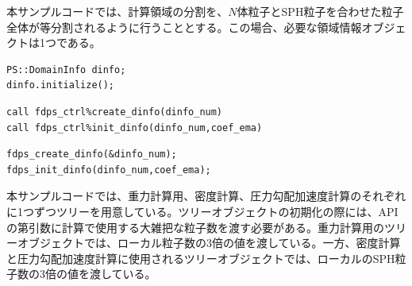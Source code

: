 本サンプルコードでは、計算領域の分割を、$N$体粒子とSPH粒子を合わせた粒子全体が等分割されるように行うこととする。この場合、必要な領域情報オブジェクトは1つである。
\ifCpp %
\begin{lstlisting}[caption=領域情報オブジェクトの生成・初期化]
PS::DomainInfo dinfo;
dinfo.initialize();
\end{lstlisting}
\endifCpp
\ifFtn %
\begin{lstlisting}[caption=領域情報オブジェクトの生成・初期化]
call fdps_ctrl%create_dinfo(dinfo_num)
call fdps_ctrl%init_dinfo(dinfo_num,coef_ema)
\end{lstlisting}
\endifFtn
\ifC %
\begin{lstlisting}[caption=領域情報オブジェクトの生成・初期化]
fdps_create_dinfo(&dinfo_num);
fdps_init_dinfo(dinfo_num,coef_ema);
\end{lstlisting}
\endifC


本サンプルコードでは、重力計算用、密度計算、圧力勾配加速度計算のそれぞれに1つずつツリーを用意している。ツリーオブジェクトの初期化の際には、API の第引数に計算で使用する大雑把な粒子数を渡す必要がある。重力計算用のツリーオブジェクトでは、ローカル粒子数の3倍の値を渡している。一方、密度計算と圧力勾配加速度計算に使用されるツリーオブジェクトでは、ローカルのSPH粒子数の3倍の値を渡している。

